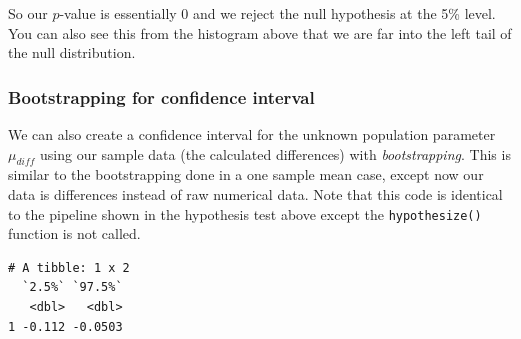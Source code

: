 \documentclass[12pt,]{krantz}
\makeatletter
\newenvironment{Shaded}{\begin{snugshade}}{\end{snugshade}}
\newcommand{\KeywordTok}[1]{\textcolor[rgb]{0.27,0.27,0.27}{\textbf{#1}}}
\newcommand{\DataTypeTok}[1]{\textcolor[rgb]{0.27,0.27,0.27}{#1}}
\newcommand{\DecValTok}[1]{\textcolor[rgb]{0.06,0.06,0.06}{#1}}
\newcommand{\StringTok}[1]{\textcolor[rgb]{0.5,0.5,0.5}{#1}}
\newcommand{\OperatorTok}[1]{\textcolor[rgb]{0.43,0.43,0.43}{\textbf{#1}}}
\newcommand{\NormalTok}[1]{#1}
\newenvironment{kframe}{%
\medskip{}
\setlength{\fboxsep}{.8em}
 \def\at@end@of@kframe{}%
 \ifinner\ifhmode%
  \def\at@end@of@kframe{\end{minipage}}%
  \begin{minipage}{\columnwidth}%
 \fi\fi%
 \def\FrameCommand##1{\hskip\@totalleftmargin \hskip-\fboxsep
 \colorbox{shadecolor}{##1}\hskip-\fboxsep
     \hskip-\linewidth \hskip-\@totalleftmargin \hskip\columnwidth}%
 \MakeFramed {\advance\hsize-\width
   \@totalleftmargin\z@ \linewidth\hsize
   \@setminipage}}%
 {\par\unskip\endMakeFramed%
 \at@end@of@kframe}
\renewenvironment{Shaded}{\begin{kframe}}{\end{kframe}}
\theoremstyle{definition}
\theoremstyle{definition}
\theoremstyle{definition}
\theoremstyle{remark}
\makeatother
\begin{document}
So our \(p\)-value is essentially 0 and we reject the null hypothesis at
the 5\% level. You can also see this from the histogram above that we
are far into the left tail of the null distribution.

\subsubsection*{Bootstrapping for confidence
interval}\label{bootstrapping-for-confidence-interval-4}

We can also create a confidence interval for the unknown population
parameter \(\mu_{diff}\) using our sample data (the calculated
differences) with \emph{bootstrapping}. This is similar to the
bootstrapping done in a one sample mean case, except now our data is
differences instead of raw numerical data. Note that this code is
identical to the pipeline shown in the hypothesis test above except the
\texttt{hypothesize()} function is not called.

\begin{Shaded}
\end{Shaded}

\begin{Shaded}
\end{Shaded}

\begin{verbatim}
# A tibble: 1 x 2
  `2.5%` `97.5%`
   <dbl>   <dbl>
1 -0.112 -0.0503
\end{verbatim}

\begin{Shaded}
\end{Shaded}
\end{document}
